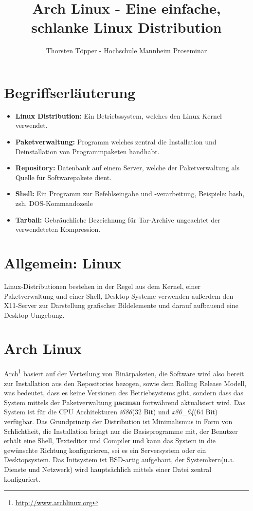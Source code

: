 \documentclass[10pt,DIV14,twocolumn]{scrartcl}
\author{Thorsten T\"{o}pper - Hochschule Mannheim Proseminar}
\title{Arch Linux - Eine einfache, schlanke Linux Distribution}
\begin{document}
\maketitle
\section*{Begriffserl\"{a}uterung}
\begin{itemize}
	\item{\textbf{Linux Distribution:} Ein Betriebssystem, welches den Linux Kernel verwendet.}
	\item{\textbf{Paketverwaltung:} Programm welches zentral die Installation und Deinstallation von Programmpaketen handhabt.}
	\item{\textbf{Repository:} Datenbank auf einem Server, welche der Paketverwaltung als Quelle f\"{u}r Softwarepakete dient.}
	\item{\textbf{Shell:} Ein Programm zur Befehlseingabe und -verarbeitung, Beispiele: bash, zsh, DOS-Kommandozeile}
	\item{\textbf{Tarball:} Gebr\"{a}uchliche Bezeichnung f\"{u}r Tar-Archive ungeachtet der verwendeteten Kompression.}
\end{itemize}

\section*{Allgemein: Linux}
Linux-Distributionen bestehen in der Regel aus dem Kernel, einer Paketverwaltung und einer Shell, Desktop-Systeme verwenden außerdem den X11-Server zur Darstellung grafischer Bildelemente und darauf aufbauend eine Desktop-Umgebung.

\section*{Arch Linux}
Arch\footnote{\url{http://www.archlinux.org}} basiert auf der Verteilung von Bin\"{a}rpaketen, die Software wird also bereit zur Installation aus den Repositories bezogen, sowie dem Rolling Release Modell, was bedeutet, dass es keine Versionen des Betriebsystems gibt, sondern dass das System mittels der Paketverwaltung \textbf{pacman} fortw\"{a}hrend aktualisiert wird. Das System ist f\"{u}r die CPU Architekturen \textit{i686}(32 Bit) und \textit{x86\_{}64}(64 Bit) verf\"{u}gbar. Das Grundprinzip der Distribution ist Minimalismus in Form von Schlichtheit, die Installation bringt nur die Basisprogramme mit, der Benutzer erh\"{a}lt eine Shell, Texteditor und Compiler und kann das System in die gew\"{u}nschte Richtung konfigurieren, sei es ein Serversystem oder ein Desktopsystem. Das Initsystem ist BSD-artig aufgebaut, der Systemkern(u.a. Dienste und Netzwerk) wird haupts\"{a}chlich mittels einer Datei zentral konfiguriert.
\end{document}
